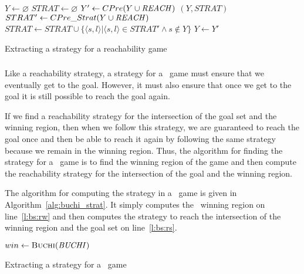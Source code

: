 \begin{algorithm}[t]
    \begin{algorithmic}[1]

\State $Y \gets \varnothing$ \label{l:rs:init}
\State $STRAT \gets \varnothing$
    \Loop
        \State $Y' \gets CPre(Y \cup \mathit{REACH})$
            \State\Return $(Y, STRAT)$
        \EndIf
        \State $STRAT' \gets CPre\_Strat(Y \cup \mathit{REACH})$ \label{l:rs:cs}
        \State $STRAT \gets STRAT \cup \{\langle s, l \rangle | \langle s, l \rangle \in STRAT' \wedge s \notin Y\}$  \label{l:rs:as}
        \State $Y \gets Y'$
    \EndLoop
\EndFunction

\end{algorithmic}
\caption{Extracting a strategy for a reachability game}
\label{alg:reach_strat}
\end{algorithm}

\subsubsection{\buchi}

Like a reachability strategy, a strategy for a \buchi\ game must ensure that we eventually get to the goal. However, it must also ensure that once we get to the goal it is still possible to reach the goal again. 

If we find a reachability strategy for the intersection of the goal set and the winning region, then when we follow this strategy, we are guaranteed to reach the goal once and then be able to reach it again by following the same strategy because we remain in the winning region. Thus, the algorithm for finding the strategy for a \buchi\ game is to find the winning region of the game and then compute the reachability strategy for the intersection of the goal and the winning region.

The algorithm for computing the strategy in a \buchi\ game is given in Algorithm~\ref{alg:buchi_strat}. It simply computes the \buchi\ winning region on line~\ref{l:bs:rw} and then computes the strategy to reach the intersection of the winning region and the goal set on line~\ref{l:bs:rs}.

\begin{algorithm}[t]
\begin{algorithmic}[1]

    \State $win \gets \Call{Buchi}{\buchiobj}$ \label{l:bs:rw}
    \State \Return {} \label{l:bs:rs}
\EndFunction

\end{algorithmic}
\caption{Extracting a strategy for a \buchi\ game}
\label{alg:buchi_strat}
\end{algorithm}

